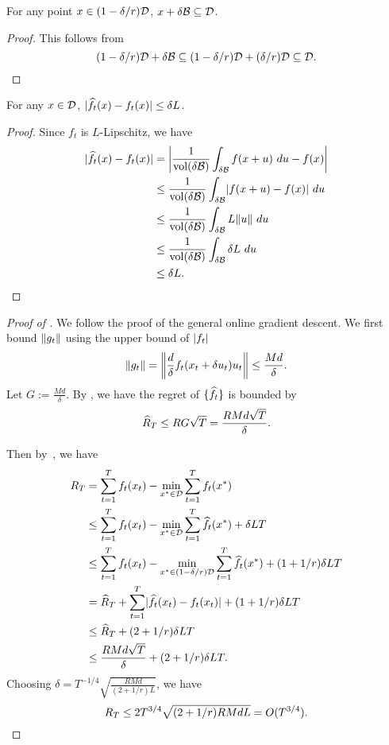 \documentclass[11pt]{article}
\begin{document}
\begin{lemma}
    For any point $x \in (1 - \delta/r)\Dc$, $x + \delta \Bc \subseteq \Dc$.
\end{lemma}
\begin{proof}
    This follows from
    \[
        (1 - \delta/r)\Dc + \delta \Bc \subseteq (1 - \delta/r)\Dc + (\delta/r) \Dc \subseteq \Dc. \qedhere
    \]
\end{proof}

\begin{lemma}\label{lm:whf_diff}
    For any $x \in \Dc$, $\abs{\wh{f}_t(x) - f_t(x)} \le \delta L$.
\end{lemma}
\begin{proof}
    Since $f_t$ is $L$-Lipschitz, we have
    \begin{align*}
        \abs{\wh{f}_t(x) - f_t(x)}
        &= \abs*{\frac{1}{\vol(\delta \Bc)} \int_{\delta\Bc} f(x + u)~du - f(x)}\\
        &\le \frac{1}{\vol(\delta \Bc)}\int_{\delta \Bc} \abs{f(x + u) - f(x)}~du\\
        &\le \frac{1}{\vol(\delta \Bc)}\int_{\delta \Bc} L \norm{u}~du\\
        &\le \frac{1}{\vol(\delta \Bc)}\int_{\delta \Bc} \delta L~du\\
        &\le \delta L. \qedhere
    \end{align*}
\end{proof}

\begin{proof}[Proof of ]
    We follow the proof of the general online gradient descent.
    We first bound $\norm{g_t}$ using the upper bound of $\abs{f_t}$
    \[
        \norm{g_t} = \norm*{\frac{d}{\delta} f_t(x_t + \delta u_t) u_t} \le \frac{Md}{\delta}.
    \]
    Let $G := \frac{Md}{\delta}$.
    By , we have the regret of $\{\wh{f}_t\}$ is bounded by
    \[
        \wh{R}_T \le RG\sqrt{T} = \frac{RMd\sqrt{T}}{\delta}.
    \]

    Then by~, we have
    \begin{align*}
        R_T &= \sum_{t=1}^T f_t(x_t) - \min_{x^* \in \Dc} \sum_{t=1}^T f_t(x^*)\\
        &\le \sum_{t=1}^T f_t(x_t) - \min_{x^* \in \Dc} \sum_{t=1}^T \wh{f_t}(x^*) + \delta LT\\
        &\le \sum_{t=1}^T f_t(x_t) - \min_{x^* \in (1 - \delta/r)\Dc} \sum_{t=1}^T \wh{f_t}(x^*) + (1 + 1/r)\delta LT\\
        &= \wh{R}_T + \sum_{t=1}^T \abs{\wh{f}_t(x_t) - f_t(x_t)} + (1 + 1/r)\delta LT\\
        &\le \wh{R}_T + (2 + 1/r)\delta LT\\
        &\le \frac{RMd\sqrt{T}}{\delta} + (2 + 1/r)\delta LT.
    \end{align*}
    Choosing $\delta = T^{-1/4}\sqrt{\frac{RMd}{(2 + 1/r)L}}$, we have
    \[
        R_T \le 2T^{3/4}\sqrt{(2 + 1/r)RMdL} = O(T^{3/4}). \qedhere
    \]
\end{proof}
\end{document}
